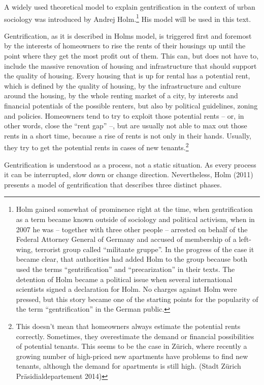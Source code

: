 \documentclass[a4paper,
fontsize=11pt,
oneside,
numbers=noperiodatend,
parskip=half-,
bibliography=totoc,
final
]{scrartcl}
\begin{document}
A widely used theoretical model to explain gentrification in the context
of urban sociology was introduced by Andrej Holm.\footnote{Holm gained
  somewhat of prominence right at the time, when gentrification as a
  term became known outside of sociology and political activism, when in
  2007 he was -- together with three other people -- arrested on behalf
  of the Federal Attorney General of Germany and accused of membership
  of a left-wing, terrorist group called \enquote{militante gruppe}. In
  the progress of the case it became clear, that authorities had added
  Holm to the group because both used the terms \enquote{gentrification}
  and \enquote{precarization} in their texts. The detention of Holm
  became a political issue when several international scientists signed
  a declaration for Holm. No charges against Holm were pressed, but this
  story became one of the starting points for the popularity of the term
  \enquote{gentrification} in the German public.} His model will be used
in this text.

Gentrification, as it is described in Holms model, is triggered first
and foremost by the interests of homeowners to rise the rents of their
housings up until the point where they get the most profit out of them.
This can, but does not have to, include the massive renovation of
housing and infrastructure that should support the quality of housing.
Every housing that is up for rental has a potential rent, which is
defined by the quality of housing, by the infrastructure and culture
around the housing, by the whole renting market of a city, by interests
and financial potentials of the possible renters, but also by political
guidelines, zoning and policies. Homeowners tend to try to exploit those
potential rents -- or, in other words, close the \enquote{rent gap} --,
but are usually not able to max out those rents in a short time, because
a rise of rents is not only in their hands. Usually, they try to get the
potential rents in cases of new tenants.\footnote{This doesn't mean that
  homeowners always estimate the potential rents correctly. Sometimes,
  they overestimate the demand or financial possibilities of potential
  tenants. This seems to be the case in Zürich, where recently a growing
  number of high-priced new apartments have problems to find new
  tenants, although the demand for apartments is still high. (Stadt
  Zürich Präsidialdepartement 2014)}

Gentrification is understood as a process, not a static situation. As
every process it can be interrupted, slow down or change direction.
Nevertheless, Holm (2011) presents a model of gentrification that
describes three distinct phases.
\end{document}
